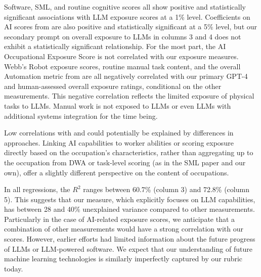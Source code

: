 \documentclass[11pt]{article}
\begin{document}
Software, SML, and routine cognitive scores all show positive and statistically significant associations with LLM exposure scores at a 1\% level. Coefficients on AI scores from \citep{Webb2020} are also positive and statistically significant at a 5\% level, but our secondary prompt on overall exposure to LLMs in columns 3 and 4 does not exhibit a statistically significant relationship. For the most part, the AI Occupational Exposure Score is not correlated with our exposure measures. Webb's Robot exposure scores, routine manual task content, and the overall Automation metric from \citep{FreyOsborne2017} are all negatively correlated with our primary GPT-4 and human-assessed overall exposure ratings, conditional on the other measurements. This negative correlation reflects the limited exposure of physical tasks to LLMs. Manual work is not exposed to LLMs or even LLMs with additional systems integration for the time being. %

Low correlations with \citep{SeamansRajFelten2018} and \citep{FreyOsborne2017} could potentially be explained by differences in approaches. Linking AI capabilities to worker abilities or scoring exposure directly based on the occupation's characteristics, rather than aggregating up to the occupation from DWA or task-level scoring (as in the SML paper and our own), offer a slightly different perspective on the content of occupations.

In all regressions, the $R^2$ ranges between 60.7\% (column 3) and 72.8\% (column 5). This suggests that our measure, which explicitly focuses on LLM capabilities, has between 28 and 40\% unexplained variance compared to other measurements. Particularly in the case of AI-related exposure scores, we anticipate that a combination of other measurements would have a strong correlation with our scores. However, earlier efforts had limited information about the future progress of LLMs or LLM-powered software. We expect that our understanding of future machine learning technologies is similarly imperfectly captured by our rubric today.
\end{document}
